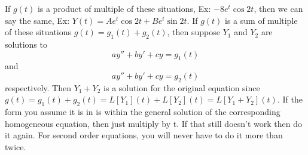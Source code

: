     \newline \indent
    If $g(t)$ is a product of multiple of these situations, Ex: $-8e^{t}\cos 2t$, then we can say the same, Ex: $Y(t) = Ae^t\cos 2t + Be^t \sin 2t$. 
    \newline \indent
    If $g(t)$ is a sum of multiple of these situations $g(t) = g_1(t) + g_2(t)$, then suppose $Y_1$ and $Y_2$ are solutions to 
    $$ay'' + by' + cy = g_1(t)$$
    and $$ay'' + by' + cy = g_2(t)$$ 
    respectively. Then $Y_1 + Y_2$ is a solution for the original equation since $g(t) = g_1(t) + g_2(t) = L[Y_1](t) + L[Y_2](t) = L[Y_1 + Y_2](t)$.
    \newline \indent
    If the form you assume it is in is within the general solution of the corresponding homogeneous equation, then just multiply by t. If that still doesn't work then do it again. For second order equations, you will never have to do it more than twice.